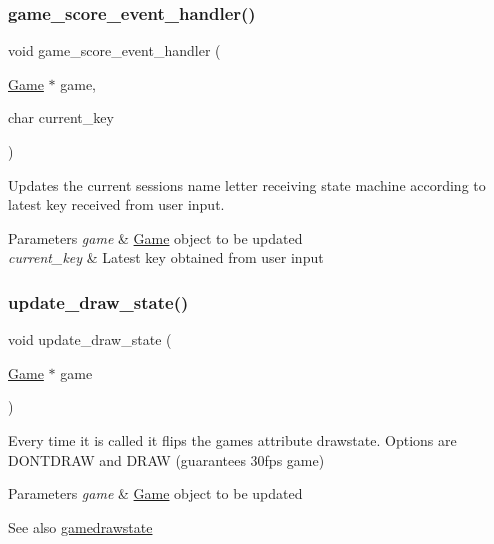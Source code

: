 \subsubsection{\texorpdfstring{game\+\_\+score\+\_\+event\+\_\+handler()}{game\_score\_event\_handler()}}
{\footnotesize\ttfamily void game\+\_\+score\+\_\+event\+\_\+handler (\begin{DoxyParamCaption}\item[{\hyperlink{struct_game}{Game} $\ast$}]{game,  }\item[{char}]{current\+\_\+key }\end{DoxyParamCaption})}



Updates the current session\textquotesingle{}s name letter receiving state machine according to latest key received from user input. 


\begin{DoxyParams}{Parameters}
{\em game} & \hyperlink{struct_game}{Game} \textquotesingle{}object\textquotesingle{} to be updated \\
\hline
{\em current\+\_\+key} & Latest key obtained from user input \\
\hline
\end{DoxyParams}
\hypertarget{group__game_ga60f9b07b784e68d3c43cc63c54847e92}{}\label{group__game_ga60f9b07b784e68d3c43cc63c54847e92} 
\subsubsection{\texorpdfstring{update\+\_\+draw\+\_\+state()}{update\_draw\_state()}}
{\footnotesize\ttfamily void update\+\_\+draw\+\_\+state (\begin{DoxyParamCaption}\item[{\hyperlink{struct_game}{Game} $\ast$}]{game }\end{DoxyParamCaption})}



Every time it is called it flips the game\textquotesingle{}s attribute drawstate. Options are D\+O\+N\+T\+D\+R\+AW and D\+R\+AW (guarantees 30fps game) 


\begin{DoxyParams}{Parameters}
{\em game} & \hyperlink{struct_game}{Game} \textquotesingle{}object\textquotesingle{} to be updated \\
\hline
\end{DoxyParams}
\begin{DoxySeeAlso}{See also}
\hyperlink{group__game_gab1e4078b5fa77cbf79de5e160f4cb261}{gamedrawstate} 
\end{DoxySeeAlso}
\hypertarget{group__game_gaf0f9fdea8b3749557a89193e12153e1e}{}\label{group__game_gaf0f9fdea8b3749557a89193e12153e1e} 
